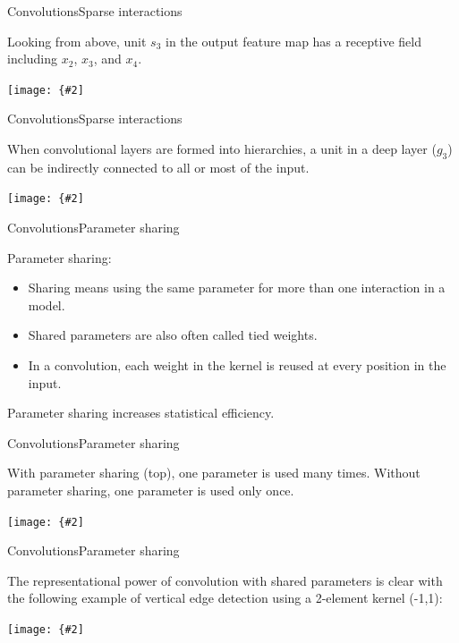 \documentclass[aspectratio=169]{beamer}
\newcommand{\myfig}[3]{\centerline{\texttt{[image: \{\#2]}}}
\begin{document}
\begin{frame}{Convolutions}{Sparse interactions}

Looking from above,
unit $s_3$ in the output feature map
has a \alert{receptive field} including $x_2$, $x_3$, and $x_4$.

\myfig{2in}{goodfellow-fig9-3}{Goodfellow et al. (2016), Figure 9.3}

\end{frame}


\begin{frame}{Convolutions}{Sparse interactions}


When convolutional layers are formed into hierarchies, a unit in a
deep layer ($g_3$) can be \alert{indirectly connected} to all or most
of the input.

\medskip

\myfig{2.5in}{goodfellow-fig9-4}{Goodfellow et al. (2016), Figure 9.4}

\end{frame}


\begin{frame}{Convolutions}{Parameter sharing}

  \alert{Parameter sharing}:
  \begin{itemize}
    \item Sharing means using the same parameter for more than one interaction
      in a model.
    \item Shared parameters are also often called \alert{tied weights}.
      \item In a convolution, each weight in the kernel
        is \alert{reused} at every position in the input.
  \end{itemize}

  Parameter sharing \alert{increases statistical efficiency}.
  
\end{frame}


\begin{frame}{Convolutions}{Parameter sharing}

With parameter sharing (top), one parameter is used many times.
Without parameter sharing, one parameter is used only once.
\myfig{2.6in}{goodfellow-fig9-5}{Goodfellow et al. (2016), Figure 9.5}

\end{frame}


\begin{frame}{Convolutions}{Parameter sharing}

The representational power of convolution with shared parameters is
clear with the following example of vertical edge detection using a
2-element kernel (-1,1):

\myfig{3in}{goodfellow-fig9-6}{Goodfellow et al. (2016), Figure 9.6}

\end{frame}
\end{document}
